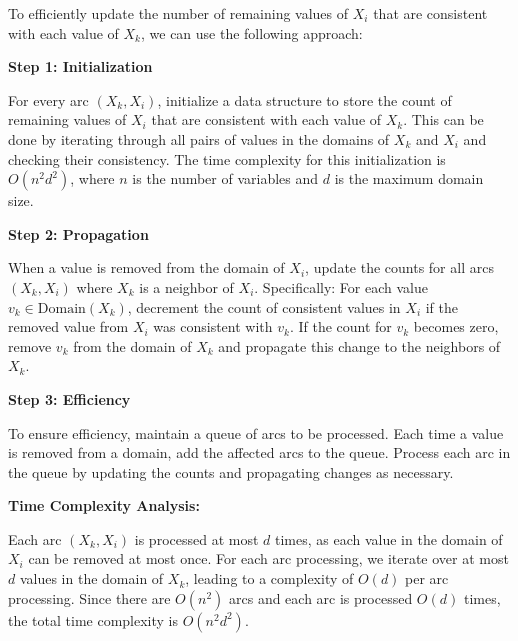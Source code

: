 \documentclass[cn,12pt]{homework}
\begin{document}
\begin{solution}
  \quad

  To efficiently update the number of remaining values of \(X_i\) that are consistent with each value of \(X_k\), we can use the following approach:

  \textbf{Step 1: Initialization}

  For every arc \((X_k, X_i)\), initialize a data structure to store the count of remaining values of \(X_i\) that are consistent with each value of \(X_k\). This can be done by iterating through all pairs of values in the domains of \(X_k\) and \(X_i\) and checking their consistency. The time complexity for this initialization is \(O(n^2d^2)\), where \(n\) is the number of variables and \(d\) is the maximum domain size.

  \textbf{Step 2: Propagation}

  When a value is removed from the domain of \(X_i\), update the counts for all arcs \((X_k, X_i)\) where \(X_k\) is a neighbor of \(X_i\). Specifically:
  For each value \(v_k \in \text{Domain}(X_k)\), decrement the count of consistent values in \(X_i\) if the removed value from \(X_i\) was consistent with \(v_k\).
  If the count for \(v_k\) becomes zero, remove \(v_k\) from the domain of \(X_k\) and propagate this change to the neighbors of \(X_k\).

  \textbf{Step 3: Efficiency}

  To ensure efficiency, maintain a queue of arcs to be processed. Each time a value is removed from a domain, add the affected arcs to the queue. Process each arc in the queue by updating the counts and propagating changes as necessary.

  \textbf{Time Complexity Analysis:}
  
  Each arc \((X_k, X_i)\) is processed at most \(d\) times, as each value in the domain of \(X_i\) can be removed at most once.
  For each arc processing, we iterate over at most \(d\) values in the domain of \(X_k\), leading to a complexity of \(O(d)\) per arc processing.
  Since there are \(O(n^2)\) arcs and each arc is processed \(O(d)\) times, the total time complexity is \(O(n^2d^2)\).

  
\end{solution}
\newpage
\end{document}
